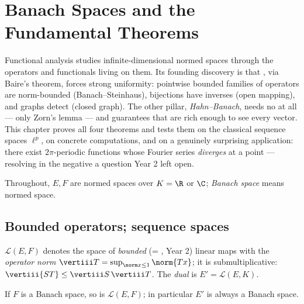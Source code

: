 \chapter{Banach Spaces and the Fundamental Theorems}
\label{ch:b3:banach}

Functional analysis studies infinite-dimensional normed spaces
through the operators and functionals living on them. Its
founding discovery is that \emph{}, via Baire's
theorem, forces strong uniformity: pointwise bounded families of
operators are norm-bounded (Banach--Steinhaus), 
bijections have  inverses (open mapping), and graphs
detect  (closed graph). The other pillar,
\emph{Hahn--Banach}, needs no  at all --- only
Zorn's lemma --- and guarantees that  are rich enough
to see every vector. This chapter proves all four theorems and
tests them on the classical sequence spaces $\ell^p$, on
concrete  computations, and on a genuinely surprising
application: there exist  $2\pi$-periodic functions
whose Fourier series \emph{diverges} at a point --- resolving in
the negative a question Year 2 left open.

Throughout, $E, F$ are normed spaces over $K = \R$ or $\C$;
\emph{Banach space} means  normed
space.

\section{Bounded operators; sequence spaces}

\begin{definition}\label{def:b3:banach:operator}
$\mathcal L(E, F)$ denotes the space of \emph{bounded}
(= , Year 2) linear maps with the \emph{operator
norm} $\vertiii T = \sup_{\norm x \leq
1}\norm{Tx}$; it is submultiplicative: $\vertiii{ST} \leq
\vertiii S\,\vertiii T$. The \emph{dual} is
$E' = \mathcal L(E, K)$.
\end{definition}

\begin{proposition}\label{prop:b3:banach:llcomplete}
If $F$ is a Banach space, so is $\mathcal L(E, F)$; in
particular $E'$ is always a Banach space.
\end{proposition}

